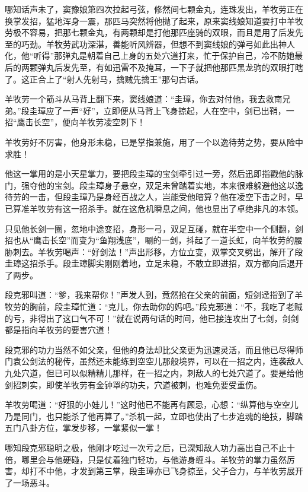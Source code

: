 \documentclass[12pt,oneside]{book}
\begin{document}
哪知话声未了，窦豫娘第四次拉起弓弦，修然间七颗金丸，连珠发出，羊牧劳正在换掌发招，猛地浑身一震，那匹马突然将他抛了起来，原来窦线娘知道要打中羊牧劳极不容易，把那七颗金丸，有两颗却是打他那匹座骑的双眼，而且是用了后发先至的巧劲。羊牧劳武功深湛，善能听风辨器，但想不到窦线娘的弹弓如此出神人化，他``听得''那弹丸是朝着自己上身的五处穴道打来，忙于保护自己，冷不防她最后的两颗弹丸后发先至，有如迅雷不及掩耳，一下子就把他那匹黑龙驹的双眼打瞎了。这正合上了``射人先射马，擒贼先擒王''那句古话。

羊牧劳一个筋斗从马背上翻下来，窦线娘道：``圭璋，你去对付他，我去救南兄弟。''段圭璋应了一声``好''，立即便从马背上飞身掠起，人在空中，剑已出鞘，一招``鹰击长空''，便向羊牧劳凌空刺下！

羊牧劳好不厉害，他身形未稳，已是掌指兼施，用了一个以逸待劳之势，要从险中求胜！

他这一掌用的是小天星掌力，要把段圭璋的宝剑牵引过一旁，然后迅即指戳他的脉门，强夺他的宝剑。段圭璋身子悬空，双足未曾踏着实地，本来很难躲避他这以逸待劳的一击，但段圭璋乃是身经百战之人，岂能受他暗算？他在凌空下击之时，早已算准羊牧劳有这一招杀手。就在这危机瞬息之间，他也显出了卓绝非凡的本领。

只见他长剑一圈，忽地中途变招，身形一弓，双足互碰，就在半空中一个侧翻，剑招也从``鹰击长空''而变为``鱼翔浅底''，唰的一剑，抖起了一道长虹，向羊牧劳的腰胁刺去。羊牧劳喝声：``好剑法！''声出形移，方位立变，双掌交叉劈出，解开了段圭璋这招杀手。段圭璋脚尖刚刚着地，立足未稳，不敢立即进招，双方都向后退开了两步。

段克邪叫道：``爹，我来帮你！''声发人到，竟然抢在父亲的前面，短剑迳指到了羊牧劳的胸前，段圭璋忙道：``克儿，你去助你的妈吧。''段克邪道：``不，我吃了老贼的亏，非得出了这口气不可！''就在说两句话的时间，他已接连攻出了七剑，剑剑都是指向羊牧劳的要害穴道！

段克邪的功力当然不如父亲，但他的身法却比父亲更为迅速灵活，而且他已尽得师门袁公剑法的秘传，虽然还未能练到空空儿那般境界，可以在一招之内，连袭敌人九处穴道，但已可以似精精儿那样，在一招之内，刺敌人的七处穴道了。要是给他剑招刺实，即使羊牧劳有金钟罩的功夫，穴道被刺，也难免要受重伤。

羊牧劳喝道：``好狠的小娃儿！''这时他已不能再有顾忌，心想：``纵算他与空空儿乃是同门，也只能杀了他再算了。''杀机一起，立即也使出了七步追魂的绝技，脚踏五门八卦方位，掌发步移，一掌紧似一掌！

哪知段克邪聪明之极，他刚才吃过一次亏之后，已深知敌人功力高出自己不止十倍，哪里会与他硬碰，只是仗着独门轻功，与他游身缠斗。羊牧劳的掌力虽然厉害，却打不中他，才发到第三掌，段圭璋亦已飞身掠至，父子合力，与羊牧劳展开了一场恶斗。
\end{document}
